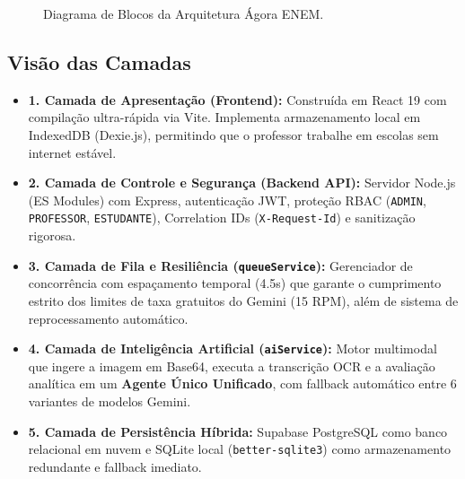 \documentclass[11pt,a4paper]{article}
\begin{document}
\begin{figure}[htbp]
\caption{Diagrama de Blocos da Arquitetura Ágora ENEM.}
\label{fig:arquitetura}
\end{figure}

\subsection{Visão das Camadas}
\begin{itemize}[leftmargin=1.5em]
    \item \textbf{1. Camada de Apresentação (Frontend):} Construída em React 19 com compilação ultra-rápida via Vite. Implementa armazenamento local em IndexedDB (Dexie.js), permitindo que o professor trabalhe em escolas sem internet estável.
    \item \textbf{2. Camada de Controle e Segurança (Backend API):} Servidor Node.js (ES Modules) com Express, autenticação JWT, proteção RBAC (\texttt{ADMIN}, \texttt{PROFESSOR}, \texttt{ESTUDANTE}), Correlation IDs (\texttt{X-Request-Id}) e sanitização rigorosa.
    \item \textbf{3. Camada de Fila e Resiliência (\texttt{queueService}):} Gerenciador de concorrência com espaçamento temporal (4.5s) que garante o cumprimento estrito dos limites de taxa gratuitos do Gemini (15 RPM), além de sistema de reprocessamento automático.
    \item \textbf{4. Camada de Inteligência Artificial (\texttt{aiService}):} Motor multimodal que ingere a imagem em Base64, executa a transcrição OCR e a avaliação analítica em um \textbf{Agente Único Unificado}, com fallback automático entre 6 variantes de modelos Gemini.
    \item \textbf{5. Camada de Persistência Híbrida:} Supabase PostgreSQL como banco relacional em nuvem e SQLite local (\texttt{better-sqlite3}) como armazenamento redundante e fallback imediato.
\end{itemize}
\end{document}
